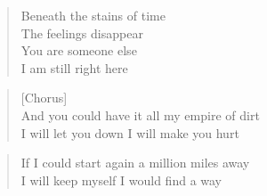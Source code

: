 \documentclass[9pt,a4paper,oneside, onecolumn]{article}
\begin{document}
\begin{verse}
Beneath the stains of time\\
The feelings disappear\\
You are someone else\\
I am still right here\\
\end{verse}


\begin{verse}
[Chorus]\\
And you could have it all my empire of dirt\\
I will let you down I will make you hurt\\
\end{verse}

\begin{verse}
If I could start again
a million miles away\\
I will keep myself
I would find a way\\
\end{verse}
\end{document}
